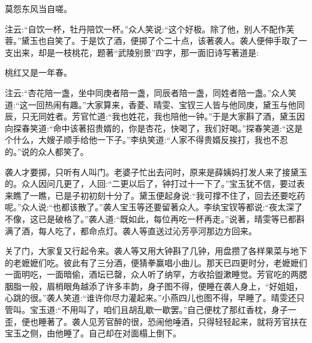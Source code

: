 \begin{poem}
    \begin{pl}莫怨东风当自嗟。\end{pl}
\end{poem}


\begin{parag}
    注云:“自饮一杯，牡丹陪饮一杯。”众人笑说:“这个好极。除了他，别人不配作芙蓉。”黛玉也自笑了。于是饮了酒，便掷了个二十点，该著袭人。袭人便伸手取了一支出来，却是一枝桃花，题著“武陵别景”四字，那一面旧诗写著道是:
\end{parag}


\begin{poem}
    \begin{pl}桃红又是一年春。\end{pl}
\end{poem}


\begin{parag}
    注云:“杏花陪一盏，坐中同庚者陪一盏，同辰者陪一盏，同姓者陪一盏。”众人笑道:“这一回热闹有趣。”大家算来，香菱、晴雯、宝钗三人皆与他同庚，黛玉与他同辰，只无同姓者。芳官忙道:“我也姓花，我也陪他一钟。”于是大家斟了酒，黛玉因向探春笑道:“命中该著招贵婿的，你是杏花，快喝了，我们好喝。”探春笑道:“这是个什么，大嫂子顺手给他一下子。”李纨笑道:“人家不得贵婿反挨打，我也不忍的。”说的众人都笑了。
\end{parag}


\begin{parag}
    袭人才要掷，只听有人叫门。老婆子忙出去问时，原来是薛姨妈打发人来了接黛玉的。众人因问几更了，人回:“二更以后了，钟打过十一下了。”宝玉犹不信，要过表来瞧了一瞧，已是子初初刻十分了。黛玉便起身说:“我可撑不住了，回去还要吃药呢。”众人说:“也都该散了。”袭人宝玉等还要留著众人。李纨宝钗等都说:“夜太深了不像，这已是破格了。”袭人道:“既如此，每位再吃一杯再走。”说著，晴雯等已都斟满了酒，每人吃了，都命点灯。袭人等直送过沁芳亭河那边方回来。
\end{parag}


\begin{parag}
    关了门，大家复又行起令来。袭人等又用大钟斟了几钟，用盘攒了各样果菜与地下的老嬷嬷们吃。彼此有了三分酒，便猜拳赢唱小曲儿。那天已四更时分，老嬷嬷们一面明吃，一面暗偷，酒坛已罄，众人听了纳罕，方收拾盥漱睡觉。芳官吃的两腮胭脂一般，眉梢眼角越添了许多丰韵，身子图不得，便睡在袭人身上，“好姐姐，心跳的很。”袭人笑道:“谁许你尽力灌起来。”小燕四儿也图不得，早睡了。晴雯还只管叫。宝玉道:“不用叫了，咱们且胡乱歇一歇罢。”自己便枕了那红香枕，身子一歪，便也睡著了。袭人见芳官醉的很，恐闹他唾酒，只得轻轻起来，就将芳官扶在宝玉之侧，由他睡了。自己却在对面榻上倒下。
\end{parag}


